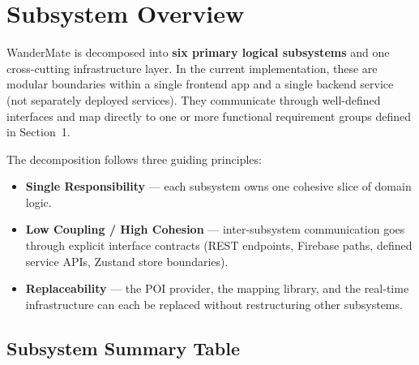 \documentclass[12pt, a4paper]{article}
\begin{document}
\section{Subsystem Overview}

WanderMate is decomposed into \textbf{six primary logical subsystems} and one cross-cutting infrastructure layer. In the current implementation, these are modular boundaries within a single frontend app and a single backend service (not separately deployed services). They communicate through well-defined interfaces and map directly to one or more functional requirement groups defined in Section~1.

The decomposition follows three guiding principles:
\begin{itemize}
  \item \textbf{Single Responsibility} --- each subsystem owns one cohesive slice of domain logic.
  \item \textbf{Low Coupling / High Cohesion} --- inter-subsystem communication goes through explicit interface contracts (REST endpoints, Firebase paths, defined service APIs, Zustand store boundaries).
  \item \textbf{Replaceability} --- the POI provider, the mapping library, and the real-time infrastructure can each be replaced without restructuring other subsystems.
\end{itemize}

\subsection{Subsystem Summary Table}
\end{document}
